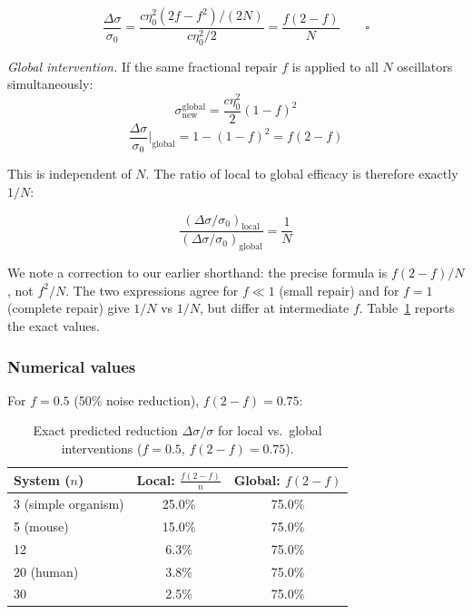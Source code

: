 \documentclass[12pt]{article}
\begin{document}
\begin{equation}
\frac{\Delta\sigma}{\sigma_0}
= \frac{c\eta_0^2(2f-f^2)/(2N)}{c\eta_0^2/2}
= \frac{f(2-f)}{N} \qquad \square
\end{equation}

\textit{Global intervention.} If the same fractional repair $f$ is applied to
all $N$ oscillators simultaneously:
\begin{equation}
\sigma_\text{new}^\text{global} = \frac{c\eta_0^2}{2}(1-f)^2
\end{equation}
\begin{equation}
\frac{\Delta\sigma}{\sigma_0}\bigg|_\text{global} = 1 - (1-f)^2 = f(2-f)
\end{equation}

This is independent of $N$. The ratio of local to global efficacy is therefore
exactly $1/N$:

\begin{equation}
\frac{(\Delta\sigma/\sigma_0)_\text{local}}{(\Delta\sigma/\sigma_0)_\text{global}} = \frac{1}{N}
\end{equation}

We note a correction to our earlier shorthand: the precise formula is
$f(2-f)/N$, not $f^2/N$. The two expressions agree for $f \ll 1$ (small repair)
and for $f=1$ (complete repair) give $1/N$ vs $1/N$, but differ at intermediate
$f$. Table~\ref{tab:scaling} reports the exact values.

\subsubsection*{Numerical values}

For $f = 0.5$ (50\% noise reduction), $f(2-f) = 0.75$:

\begin{table}[h]
\centering
\caption{Exact predicted reduction $\Delta\sigma/\sigma$ for local vs.\
global interventions ($f = 0.5$, $f(2-f) = 0.75$).}
\label{tab:scaling}
\begin{tabular}{lcc}
\toprule
System ($n$) & Local: $\frac{f(2-f)}{n}$ & Global: $f(2-f)$ \\
\midrule
3 (simple organism) & 25.0\% & 75.0\% \\
5 (mouse)           & 15.0\% & 75.0\% \\
12                  & 6.3\%  & 75.0\% \\
20 (human)          & 3.8\%  & 75.0\% \\
30                  & 2.5\%  & 75.0\% \\
\bottomrule
\end{tabular}
\end{table}
\end{document}
